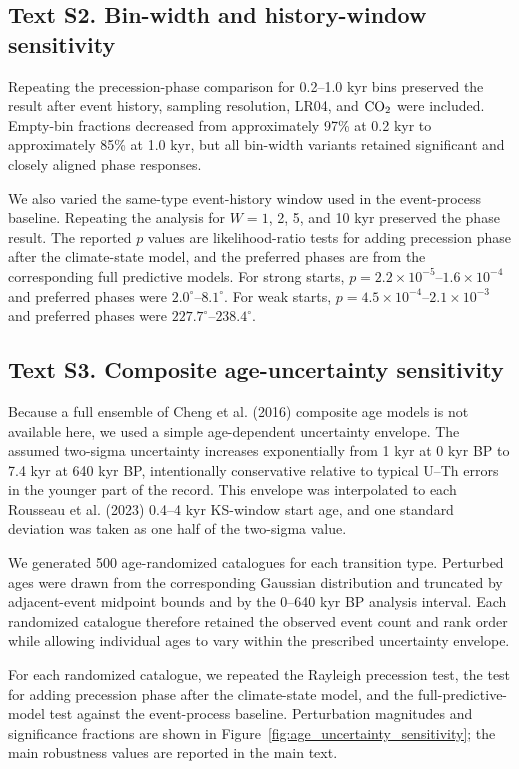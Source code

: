 \documentclass[11pt]{article}
\begin{document}
\subsection*{Text S2. Bin-width and history-window sensitivity}

Repeating the precession-phase comparison for 0.2--1.0 kyr bins preserved the result after event history, sampling resolution, LR04, and \(\ce{CO2}\) were included. Empty-bin fractions decreased from approximately 97\% at 0.2 kyr to approximately 85\% at 1.0 kyr, but all bin-width variants retained significant and closely aligned phase responses.

We also varied the same-type event-history window used in the event-process baseline. Repeating the analysis for \(W=1\), 2, 5, and 10 kyr preserved the phase result. The reported \(p\) values are likelihood-ratio tests for adding precession phase after the climate-state model, and the preferred phases are from the corresponding full predictive models. For strong starts, \(p=2.2\times10^{-5}\)--\(1.6\times10^{-4}\) and preferred phases were \(2.0^\circ\)--\(8.1^\circ\). For weak starts, \(p=4.5\times10^{-4}\)--\(2.1\times10^{-3}\) and preferred phases were \(227.7^\circ\)--\(238.4^\circ\). 

\subsection*{Text S3. Composite age-uncertainty sensitivity}

Because a full ensemble of Cheng et al. (2016) composite age models is not available here, we used a simple age-dependent uncertainty envelope. The assumed two-sigma uncertainty increases exponentially from 1 kyr at 0 kyr BP to 7.4 kyr at 640 kyr BP, intentionally conservative relative to typical U--Th errors in the younger part of the record. This envelope was interpolated to each Rousseau et al. (2023) 0.4--4 kyr KS-window start age, and one standard deviation was taken as one half of the two-sigma value.

We generated 500 age-randomized catalogues for each transition type. Perturbed ages were drawn from the corresponding Gaussian distribution and truncated by adjacent-event midpoint bounds and by the 0--640 kyr BP analysis interval. Each randomized catalogue therefore retained the observed event count and rank order while allowing individual ages to vary within the prescribed uncertainty envelope.

For each randomized catalogue, we repeated the Rayleigh precession test, the test for adding precession phase after the climate-state model, and the full-predictive-model test against the event-process baseline. Perturbation magnitudes and significance fractions are shown in Figure~\ref{fig:age_uncertainty_sensitivity}; the main robustness values are reported in the main text.
\end{document}

